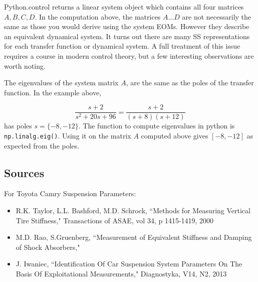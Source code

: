 Python.control returns a linear system object which contains all four matrices $A,B,C,D$.
In the computation above, the matrices $A \dots D$ are not necessarily the same as those you would
derive using the system EOMs.   However they describe an equivalent dynamical system.  It turns
out there are many SS representations for each transfer function or dynamical system.
A full treatment of this issue requires a course in modern control theory, but a few interesting
 observations are worth noting.

The eigenvalues of the system matrix $A$, are the same as the poles of the transfer function.
 In the example above,

\[
\frac{s+2}{s^2+20s+96} = \frac{s+2}{(s+8)(s+12)}
\]
has poles $s=\{-8,-12\}$.    The function to compute eigenvalues in python is {\tt np.linalg.eig()}.  Using
it on the matrix $A$ computed above gives $[-8, -12]$ as expected from the poles.

%
%


\subsection{Sources}
For Toyota Camry Suspension Parameters:
\begin{itemize}
    \item R.K. Taylor, L.L. Bashford, M.D. Schrock, ``Methods for Measuring Vertical Tire Stiffness,"
    Transactions of ASAE, vol 34, p 1415-1419, 2000
    \item M.D. Rao, S.Gruenberg, ``Measurement of Equivalent Stiffness and Damping of Shock Absorbers,"
    \item J. Iwaniec, ``Identification Of Car Suspension System Parameters On The Basis Of Exploitational Measurements," Diagnostyka, V14, N2, 2013
\end{itemize}

